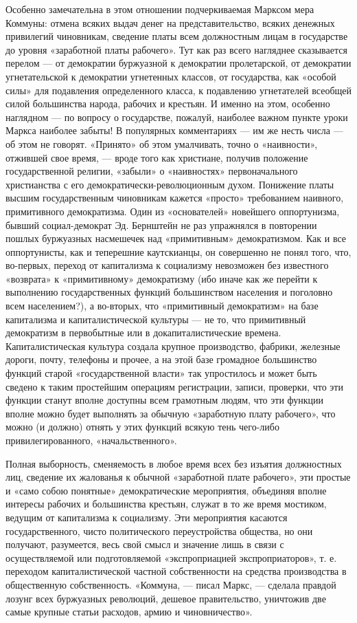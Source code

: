 \documentclass[12pt]{article}
\newcommand{\parnum}{(\arabic{parcount})}
\newcounter{parcount}
\newenvironment{parnumbers}{%
  \par%
  \everypar{\noindent \stepcounter{parcount}\marginpar[]{\parnum}}%
}{}
\begin{document}
\begin{parnumbers}
Особенно замечательна в этом отношении подчеркиваемая Марксом мера Коммуны: отмена всяких выдач денег на представительство, всяких денежных привилегий чиновникам, сведение платы всем должностным лицам в государстве до уровня «заработной платы рабочего». Тут как раз всего нагляднее сказывается перелом — от демократии буржуазной к демократии пролетарской, от демократии угнетательской к демократии угнетенных классов, от государства, как «особой силы» для подавления определенного класса, к подавлению угнетателей всеобщей силой большинства народа, рабочих и крестьян. И именно на этом, особенно наглядном — по вопросу о государстве, пожалуй, наиболее важном пункте уроки Маркса наиболее забыты! В популярных комментариях — им же несть числа — об этом не говорят. «Принято» об этом умалчивать, точно о «наивности», отжившей свое время, — вроде того как христиане, получив положение государственной религии, «забыли» о «наивностях» первоначального христианства с его демократически-революционным духом. Понижение платы высшим государственным чиновникам кажется «просто» требованием наивного, примитивного демократизма. Один из «основателей» новейшего оппортунизма, бывший социал-демократ Эд. Бернштейн не раз упражнялся в повторении пошлых буржуазных насмешечек над «примитивным» демократизмом. Как и все оппортунисты, как и теперешние каутскианцы, он совершенно не понял того, что, во-первых, переход от капитализма к социализму невозможен без известного «возврата» к «примитивному» демократизму (ибо иначе как же перейти к выполнению государственных функций большинством населения и поголовно всем населением?), а во-вторых, что «примитивный демократизм» на базе капитализма и капиталистической культуры — не то, что примитивный демократизм в первобытные или в докапиталистические времена. Капиталистическая культура создала крупное производство, фабрики, железные дороги, почту, телефоны и прочее, а на этой базе громадное большинство функций старой «государственной власти» так упростилось и может быть сведено к таким простейшим операциям регистрации, записи, проверки, что эти функции станут вполне доступны всем грамотным людям, что эти функции вполне можно будет выполнять за обычную «заработную плату рабочего», что можно (и должно) отнять у этих функций всякую тень чего-либо привилегированного, «начальственного».

Полная выборность, сменяемость в любое время всех без изъятия должностных лиц, сведение их жалованья к обычной «заработной плате рабочего», эти простые и «само собою понятные» демократические мероприятия, объединяя вполне интересы рабочих и большинства крестьян, служат в то же время мостиком, ведущим от капитализма к социализму. Эти мероприятия касаются государственного, чисто политического переустройства общества, но они получают, разумеется, весь свой смысл и значение лишь в связи с осуществляемой или подготовляемой «экспроприацией экспроприаторов», т. е. переходом капиталистической частной собственности на средства производства в общественную собственность. «Коммуна, — писал Маркс, — сделала правдой лозунг всех буржуазных революций, дешевое правительство, уничтожив две самые крупные статьи расходов, армию и чиновничество».


\end{parnumbers}
\end{document}
